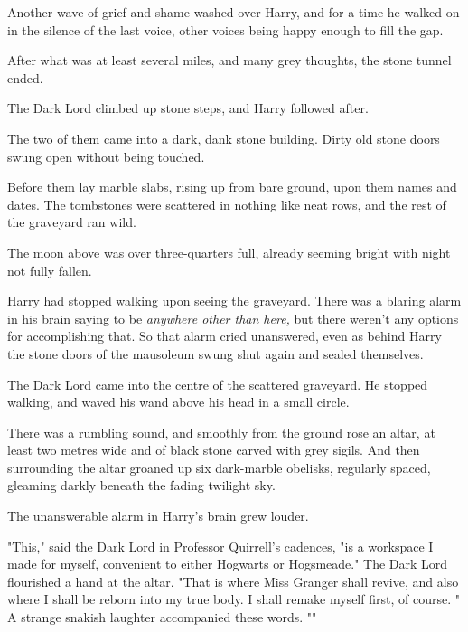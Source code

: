 Another wave of grief and shame washed over Harry, and for a time he walked on
in the silence of the last voice, other voices being happy enough to fill the
gap.

After what was at least several miles, and many grey thoughts, the stone tunnel
ended.

The Dark Lord climbed up stone steps, and Harry followed after.

The two of them came into a dark, dank stone building. Dirty old stone doors
swung open without being touched.

Before them lay marble slabs, rising up from bare ground, upon them names and
dates. The tombstones were scattered in nothing like neat rows, and the rest of
the graveyard ran wild.

The moon above was over three-quarters full, already seeming bright with night
not fully fallen.

Harry had stopped walking upon seeing the graveyard. There was a blaring alarm
in his brain saying to be \emph{anywhere other than here,} but there weren't
any options for accomplishing that. So that alarm cried unanswered, even as
behind Harry the stone doors of the mausoleum swung shut again and sealed
themselves.

The Dark Lord came into the centre of the scattered graveyard. He stopped
walking, and waved his wand above his head in a small circle.

There was a rumbling sound, and smoothly from the ground rose an altar, at
least two metres wide and of black stone carved with grey sigils. And then
surrounding the altar groaned up six dark-marble obelisks, regularly spaced,
gleaming darkly beneath the fading twilight sky.

The unanswerable alarm in Harry's brain grew louder.

"This," said the Dark Lord in Professor Quirrell's cadences, "is a workspace I
made for myself, convenient to either Hogwarts or Hogsmeade." The Dark Lord
flourished a hand at the altar. "That is where Miss Granger shall revive, and
also where I shall be reborn into my true body. I shall remake myself first, of
course. " A strange
snakish laughter accompanied these words. ""

